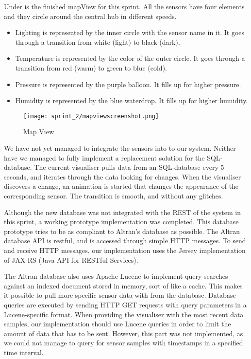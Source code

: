 \documentclass[../document]{subfiles}
\begin{document}
Under is the finished mapView for this sprint. All the sensors have four elements and they circle around the central hub in different speeds.

\begin{itemize}
\item
Lighting is represented by the inner circle with the sensor name in it. It goes through a transition from white (light) to black (dark).
\item
Temperature is represented by the color of the outer circle. It goes through a transition from red (warm) to green to blue (cold).
\item
Pressure is represented by the purple balloon. It fills up for higher pressure.
\item
Humidity is represented by the blue waterdrop. It fills up for higher humidity.
\end{itemize}

\begin{figure}[H]
	\centering
	\texttt{[image: sprint\_2/mapviewscreenshot.png]}
	\caption{Map View}
\end{figure}

We have not yet managed to integrate the sensors into to our system. Neither have we managed to fully implement a replacement solution for the \gls{SQL}-database. The current visualiser pulls data from an \gls{SQL}-database every 5 seconds, and iterates through the data looking for changes. When the visualiser discovers a change, an animation is started that changes the appearance of the corresponding sensor. The transition is smooth, and without any glitches.

Although the new database was not integrated with the \gls{REST} of the system in this sprint, a working prototype implementation was completed. This database prototype tries to be as compliant to Altran’s database as possible. The \gls{Altran} database \gls{API} is restful, and is accessed through simple \gls{HTTP} messages. To send and receive \gls{HTTP} messages, our implementation uses the Jersey implementation of JAX-RS (\gls{Java} \gls{API} for RESTful Services).

The \gls{Altran} database also uses Apache Lucene to implement query searches against an indexed document stored in memory, sort of like a cache. This makes it possible to pull more specific sensor data with from the database. Database queries are executed by sending \gls{HTTP} GET requests with query parameters in a Lucene-specific format. When providing the visualiser with the most recent data samples, our implementation should use Lucene queries in order to limit the amount of data that has to be sent. However, this part was not implemented, as we could not manage to query for sensor samples with timestamps in a specified time interval.
\end{document}
